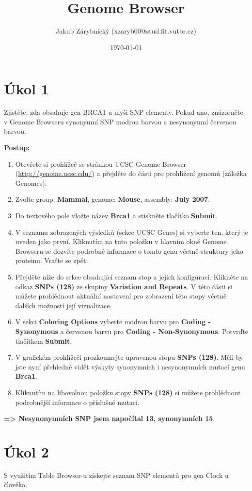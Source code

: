 \documentclass[11pt]{article}
\author{Jakub Zárybnický (xzaryb00@stud.fit.vutbr.cz)}
\date{\today}
\title{Genome Browser}
\begin{document}
\maketitle

\section{Úkol 1}
\label{sec:orgfe93d07}
Zjistěte, zda obsahuje gen BRCA1 u myši SNP elementy. Pokud ano, znázorněte v
Genome Browseru synonymní SNP modrou barvou a nesynonymní červenou
barvou.

\textbf{Postup:}
\begin{enumerate}
\item Otevřete si prohlížeč se stránkou UCSC Genome Browser
(\url{http://genome.ucsc.edu/}) a přejděte do části pro prohlížení genomů (záložka
Genomes).
\item Zvolte group: \textbf{Mammal}, genome: \textbf{Mouse}, assembly: \textbf{July 2007}.
\item Do textového pole vložte název \textbf{Brca1} a stiskněte tlačítko \textbf{Submit}.
\item V seznamu zobrazených výsledků (sekce UCSC Genes) si vyberte ten, který je
uveden jako první. Kliknutím na tuto položku v hlavním okně Genome Browseru
se dozvíte podrobné informace o tomto genu včetně struktury jeho
proteinu. Vraťte se zpět.
\item Přejděte níže do sekce obsahující seznam stop a jejich konfiguraci.  Klikněte
na odkaz \textbf{SNPs (128)} ze skupiny \textbf{Variation and Repeats}. V této části si můžete
prohlédnout aktuální nastavení pro zobrazení této stopy včetně dalších
možností její vizualizace.
\item V sekci \textbf{Coloring Options} vyberte modrou barvu pro \textbf{Coding - Synonymous} a
červenou barvu pro \textbf{Coding - Non-Synonymous}. Potvrďte tlačítkem \textbf{Submit}.
\item V grafickém prohlížeči prozkoumejte upravenou stopu \textbf{SNPs (128)}.  Měli by jste
nyní přehledně vidět výskyty synonymních i nesynonymních mutací genu \textbf{Brca1}.
\item Kliknutím na libovolnou položku stopy \textbf{SNPs (128)} si můžete prohlédnout
podrobnější informace o příslušné mutaci.
\end{enumerate}

\textbf{=> Nesynonymních SNP jsem napočítal 13, synonymních 15}

\section{Úkol 2}
\label{sec:orge1f197e}
S využitím Table Browser-u získejte seznam SNP elementů pro gen Clock u člověka.
\end{document}
